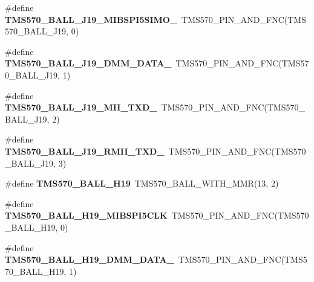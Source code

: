 \begin{DoxyCompactItemize}
\mbox{\label{tms570ls3137zwt-pins_8h_a81a0f2eaf3f49ffb3cf4982b5b83c2a3}} 
\#define {\bfseries T\+M\+S570\+\_\+\+B\+A\+L\+L\+\_\+\+J19\+\_\+\+M\+I\+B\+S\+P\+I5\+S\+I\+M\+O\+\_}~T\+M\+S570\+\_\+\+P\+I\+N\+\_\+\+A\+N\+D\+\_\+\+F\+NC(T\+M\+S570\+\_\+\+B\+A\+L\+L\+\_\+\+J19, 0)
\item 
\mbox{\label{tms570ls3137zwt-pins_8h_acec076ae769b33b456a29cefd289e558}} 
\#define {\bfseries T\+M\+S570\+\_\+\+B\+A\+L\+L\+\_\+\+J19\+\_\+\+D\+M\+M\+\_\+\+D\+A\+T\+A\+\_}~T\+M\+S570\+\_\+\+P\+I\+N\+\_\+\+A\+N\+D\+\_\+\+F\+NC(T\+M\+S570\+\_\+\+B\+A\+L\+L\+\_\+\+J19, 1)
\item 
\mbox{\label{tms570ls3137zwt-pins_8h_a41a671446e6e5d8fa384a51af037975d}} 
\#define {\bfseries T\+M\+S570\+\_\+\+B\+A\+L\+L\+\_\+\+J19\+\_\+\+M\+I\+I\+\_\+\+T\+X\+D\+\_}~T\+M\+S570\+\_\+\+P\+I\+N\+\_\+\+A\+N\+D\+\_\+\+F\+NC(T\+M\+S570\+\_\+\+B\+A\+L\+L\+\_\+\+J19, 2)
\item 
\mbox{\label{tms570ls3137zwt-pins_8h_a9d6f179b623fdf5c422803ccb36f677a}} 
\#define {\bfseries T\+M\+S570\+\_\+\+B\+A\+L\+L\+\_\+\+J19\+\_\+\+R\+M\+I\+I\+\_\+\+T\+X\+D\+\_}~T\+M\+S570\+\_\+\+P\+I\+N\+\_\+\+A\+N\+D\+\_\+\+F\+NC(T\+M\+S570\+\_\+\+B\+A\+L\+L\+\_\+\+J19, 3)
\item 
\mbox{\label{tms570ls3137zwt-pins_8h_a70ec25fd5884725bb159aca85d614cdb}} 
\#define {\bfseries T\+M\+S570\+\_\+\+B\+A\+L\+L\+\_\+\+H19}~T\+M\+S570\+\_\+\+B\+A\+L\+L\+\_\+\+W\+I\+T\+H\+\_\+\+M\+MR(13, 2)
\item 
\mbox{\label{tms570ls3137zwt-pins_8h_aeb5ea49bce0f87b251bee68a3f2084d9}} 
\#define {\bfseries T\+M\+S570\+\_\+\+B\+A\+L\+L\+\_\+\+H19\+\_\+\+M\+I\+B\+S\+P\+I5\+C\+LK}~T\+M\+S570\+\_\+\+P\+I\+N\+\_\+\+A\+N\+D\+\_\+\+F\+NC(T\+M\+S570\+\_\+\+B\+A\+L\+L\+\_\+\+H19, 0)
\item 
\mbox{\label{tms570ls3137zwt-pins_8h_a36ccf7b7f8fe3176f74783ec6d4fedef}} 
\#define {\bfseries T\+M\+S570\+\_\+\+B\+A\+L\+L\+\_\+\+H19\+\_\+\+D\+M\+M\+\_\+\+D\+A\+T\+A\+\_}~T\+M\+S570\+\_\+\+P\+I\+N\+\_\+\+A\+N\+D\+\_\+\+F\+NC(T\+M\+S570\+\_\+\+B\+A\+L\+L\+\_\+\+H19, 1)

\end{DoxyCompactItemize}

